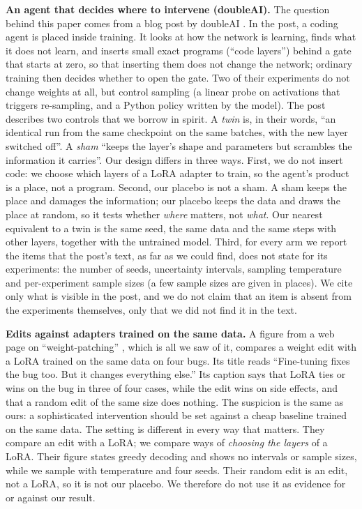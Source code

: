 \documentclass[11pt]{article}
\begin{document}
\textbf{An agent that decides where to intervene (doubleAI).} The question behind this paper comes from a blog post by doubleAI \citep{doubleai2026}. In the post, a coding agent is placed inside training. It looks at how the network is learning, finds what it does not learn, and inserts small exact programs (``code layers'') behind a gate that starts at zero, so that inserting them does not change the network; ordinary training then decides whether to open the gate. Two of their experiments do not change weights at all, but control sampling (a linear probe on activations that triggers re-sampling, and a Python policy written by the model). The post describes two controls that we borrow in spirit. A \emph{twin} is, in their words, ``an identical run from the same checkpoint on the same batches, with the new layer switched off''. A \emph{sham} ``keeps the layer's shape and parameters but scrambles the information it carries''. Our design differs in three ways. First, we do not insert code: we choose which layers of a LoRA adapter to train, so the agent's product is a place, not a program. Second, our placebo is not a sham. A sham keeps the place and damages the information; our placebo keeps the data and draws the place at random, so it tests whether \emph{where} matters, not \emph{what}. Our nearest equivalent to a twin is the same seed, the same data and the same steps with other layers, together with the untrained model. Third, for every arm we report the items that the post's text, as far as we could find, does not state for its experiments: the number of seeds, uncertainty intervals, sampling temperature and per-experiment sample sizes (a few sample sizes are given in places). We cite only what is visible in the post, and we do not claim that an item is absent from the experiments themselves, only that we did not find it in the text.

\textbf{Edits against adapters trained on the same data.} A figure from a web page on ``weight-patching'' \citep{kevinpl07weightpatching}, which is all we saw of it, compares a weight edit with a LoRA trained on the same data on four bugs. Its title reads ``Fine-tuning fixes the bug too. But it changes everything else.'' Its caption says that LoRA ties or wins on the bug in three of four cases, while the edit wins on side effects, and that a random edit of the same size does nothing. The suspicion is the same as ours: a sophisticated intervention should be set against a cheap baseline trained on the same data. The setting is different in every way that matters. They compare an edit with a LoRA; we compare ways of \emph{choosing the layers} of a LoRA. Their figure states greedy decoding and shows no intervals or sample sizes, while we sample with temperature and four seeds. Their random edit is an edit, not a LoRA, so it is not our placebo. We therefore do not use it as evidence for or against our result.
\end{document}
